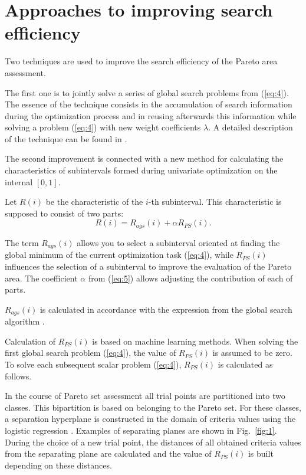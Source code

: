 \documentclass[runningheads]{llncs}
\begin{document}
\section{Approaches to improving search efficiency}

Two techniques are used to improve the search efficiency of the Pareto area assessment. 

The first one is to jointly solve a series of global search problems from (\ref{eq:4}). The essence of the technique consists in the accumulation of search information during the optimization process and in reusing afterwards this information while solving a problem (\ref{eq:4}) with new weight coefficients $\lambda$. A detailed description of the technique can be found in \cite{GergelKozinovAPI2016,Gergel2018}.

The second improvement is connected with a new method for calculating the characteristics of subintervals formed during univariate optimization on the internal $[0,1]$.

Let $R(i)$ be the characteristic of the $i$-th subinterval. This characteristic is supposed to consist of two parts:
\begin{equation}
R(i)=R_{ags} (i)+ \alpha R_{PS} (i).
\label{eq:5}
\end{equation}

The term $R_{ags}(i)$ allows you to select a subinterval oriented at finding the global minimum of the current optimization task (\ref{eq:4}), while $R_{PS}(i)$ influences the selection of a subinterval to improve the evaluation of the Pareto area. The coefficient $\alpha$ from (\ref{eq:5}) allows adjusting the contribution of each of parts.

$R_{ags}(i)$ is calculated in accordance with the expression from the global search algorithm \cite{GergelKozinovAPI2016,Gergel2018,Sergeyev2013,Strongin2000}.

Calculation of $R_{PS}(i)$ is based on machine learning methods. When solving the first global search problem (\ref{eq:4}), the value of $R_{PS}(i)$ is assumed to be zero. To solve each subsequent scalar problem (\ref{eq:4}), $R_{PS}(i)$ is calculated as follows.

In the course of Pareto set assessment all trial points are partitioned into two classes. This bipartition is based on belonging to the Pareto set. For these classes, a separation hyperplane is constructed in the domain of criteria values using the logistic regression \cite{Yu2011}. Examples of separating planes are shown in Fig.~\ref{fig:1}. During the choice of a new trial point, the distances of all obtained criteria values from the separating plane are calculated and the value of $R_{PS}(i)$ is built depending on these distances. 
\end{document}
